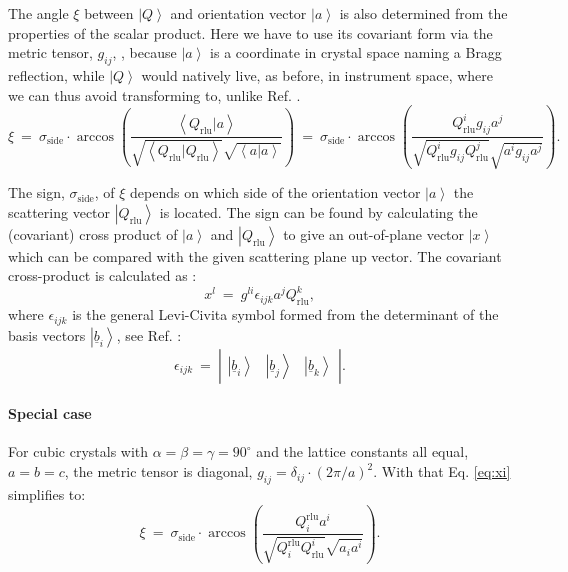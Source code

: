 

The angle $\xi$ between $\left| Q \right>$ and orientation vector $\left| a \right>$ is also determined 
from the properties of the scalar product.
Here we have to use its covariant form via the metric tensor, $g_{ij}$, \cite[p. 808]{Arens2015},
because $\left| a \right>$ is a coordinate in crystal space naming a Bragg reflection,
while $\left| Q \right>$ would natively live, as before, in instrument space, where we can thus avoid transforming to,
unlike Ref. \cite{Lumsden2005}.
\begin{equation} 
	\boxed{ \xi \ =\  
\sigma_{\mathrm{side}} \cdot \arccos \left( \frac{ \left< Q_{\mathrm{rlu}} | a \right> }{ \sqrt{\left< Q_{\mathrm{rlu}} | Q_{\mathrm{rlu}} \right>} \sqrt{\left< a | a \right>} } \right) \ =\  
\sigma_{\mathrm{side}} \cdot \arccos \left( \frac{ Q_{\mathrm{rlu}}^i g_{ij} a^j }{ \sqrt{Q_{\mathrm{rlu}}^i g_{ij} Q_{\mathrm{rlu}}^j} \sqrt{a^i g_{ij} a^j} } \right).}
\label{eq:xi}
\end{equation}

The sign, $\sigma_{\mathrm{side}}$, of $\xi$ depends on which side of the orientation vector 
$\left| a \right>$ the scattering vector $\left| Q_{\mathrm{rlu}} \right>$ is located. 
The sign can be found by calculating the (covariant) cross product of $\left| a \right>$ and 
$\left| Q_{\mathrm{rlu}} \right>$ to give an out-of-plane vector $\left| x \right>$ which can be compared with 
the given scattering plane up vector.
The covariant cross-product is calculated as \cite[p. 815]{Arens2015}:
\begin{equation}
	x^l \ =\  g^{li} \epsilon_{ijk} a^j Q_{\mathrm{rlu}}^k,
\end{equation}
where $\epsilon_{ijk}$ is the general Levi-Civita symbol formed from the determinant of the 
basis vectors $\left| \underline{b}_i \right>$, see Ref. \cite[p. 815]{Arens2015}:
\begin{equation}
	\epsilon_{ijk} \ =\  \left|
		\begin{array}{ccc} \left| 
			\underline{b}_i \right> & \left| \underline{b}_j \right> & \left| \underline{b}_k \right>
		\end{array} \right|.
\end{equation}



\paragraph*{Special case}
For cubic crystals with $\alpha = \beta = \gamma = 90^{\circ}$ and the lattice constants all equal, 
$a = b = c$, the metric tensor is diagonal, $g_{ij} = \delta_{ij} \cdot \left( 2\pi / a \right)^2$.
With that Eq. \ref{eq:xi} simplifies to:
\begin{equation}
	\xi \ =\  \sigma_{\mathrm{side}} \cdot \arccos \left( \frac{ Q^{\mathrm{rlu}}_i a^i }{ \sqrt{Q^{\mathrm{rlu}}_i Q_{\mathrm{rlu}}^i} \sqrt{a_i a^i} } \right).
\end{equation}


